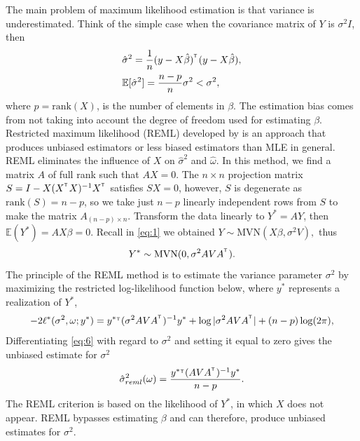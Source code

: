 \documentclass{article}\usepackage[]{graphicx}\usepackage[]{color}
\def\MVN{{\mathrm{MVN}}}
\def\T{{\footnotesize {^{_{\sf T}}}}}
\def\E{\mathbb{E}} %
\begin{document}
The main problem of maximum likelihood estimation is that variance is underestimated. Think of the simple case when the covariance matrix of $Y$ is $\sigma^2 I$, then 
\begin{align*}
&\hat{\sigma}^2 = \frac{1}{n}(y-X\hat{\beta})^\T (y-X\hat{\beta}),\\
&\E[\hat{\sigma}^2]=\frac{n-p}{n} \sigma^2 < \sigma^2,
\end{align*}
where $p= \text{rank}(X)$, is the number of elements in $\beta$. The estimation bias comes from not taking into account the degree of freedom used for estimating $\beta$. Restricted maximum likelihood (REML) developed by \cite{patterson1971recovery} is an approach that produces unbiased estimators or less biased estimators than MLE in general. REML eliminates the influence of $X$ on $\hat{\sigma}^2$ and $\hat{\omega}$. In this method, we find a matrix $A$ of full rank such that $AX=0$. The $n \times n$ projection matrix $S= I-X(X^\T X)^{-1}X^\T$ satisfies $SX=0$, however, $S$ is degenerate as $\text{rank}(S)=n-p$, so we take just $n-p$ linearly independent rows from $S$ to make the matrix $A_{(n-p)\times n}$. Transform the data linearly to $Y^*=AY$, then $\E(Y^*)=AX\beta=0$. Recall in \eqref{eq:1} we obtained $Y \sim \MVN (X\beta, \sigma^2 V),$ thus
%
\begin{equation*}
Y^* \sim \MVN(0,\sigma^2 AVA^\T).
\end{equation*}
%
The principle of the REML method is to estimate the variance parameter $\sigma^2$ by maximizing the restricted log-likelihood function below, where $y^*$ represents a realization of $Y^*$,
\begin{equation} \label{eq:6}
-2\ell^*(\sigma^2, \omega ;y^*)=y^*\T(\sigma^2 AVA^\T)^{-1}y^*+\log|\sigma^2 AVA^\T|+(n-p)\log(2\pi),
\end{equation}
Differentiating \eqref{eq:6} with regard to $\sigma^2$ and setting it equal to zero gives the unbiased estimate for $\sigma^2$
%
\begin{gather*} %
\hat{\sigma}_{reml}^2(\omega)= \frac{y^*\T (AVA^\T)^{-1} y^*}{n-p}.
\end{gather*}
%
The REML criterion is based on the likelihood of $Y^*$, in which $X$ does not appear.  REML bypasses estimating $\beta$ and can therefore, produce unbiased estimates for $\sigma^2$.
\end{document}
